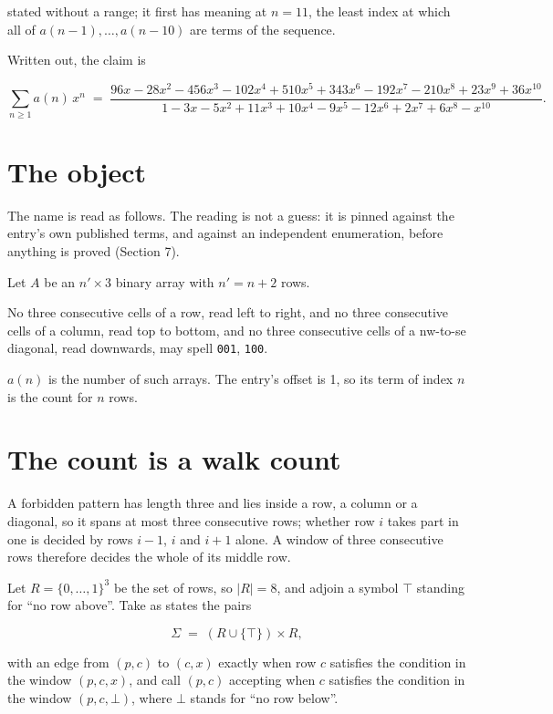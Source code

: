 \documentclass[11pt]{article}
\theoremstyle{definition}
\begin{document}
stated without a range; it first has meaning at $n = 11$, the least index at which all of $a(n-1),\dots,a(n-10)$ are terms of the sequence.

Written out, the claim is

\[\sum_{n \ge 1} a(n)\,x^n \;=\; \frac{96x - 28x^{2} - 456x^{3} - 102x^{4} + 510x^{5} + 343x^{6} - 192x^{7} - 210x^{8} + 23x^{9} + 36x^{10}}{1 - 3x - 5x^{2} + 11x^{3} + 10x^{4} - 9x^{5} - 12x^{6} + 2x^{7} + 6x^{8} - x^{10}}.\]

\section{The object}

The name is read as follows. The reading is not a guess: it is pinned against the entry's own published terms, and against an independent enumeration, before anything is proved (Section 7).

Let $A$ be an $n' \times 3$ binary array with $n' = n + 2$ rows.

No three consecutive cells of a row, read left to right, and no three consecutive cells of a column, read top to bottom, and no three consecutive cells of a nw-to-se diagonal, read downwards, may spell \texttt{001}, \texttt{100}.

$a(n)$ is the number of such arrays. The entry's offset is 1, so its term of index $n$ is the count for $n$ rows.

\section{The count is a walk count}

A forbidden pattern has length three and lies inside a row, a column or a diagonal, so it spans at most three consecutive rows; whether row $i$ takes part in one is decided by rows $i-1$, $i$ and $i+1$ alone. A window of three consecutive rows therefore decides the whole of its middle row.

Let $R = \{0,\dots,1\}^{3}$ be the set of rows, so $|R| = 8$, and adjoin a symbol $\top$ standing for ``no row above''. Take as states the pairs

\[\Sigma \;=\; (R \cup \{\top\}) \times R,\]

with an edge from $(p,c)$ to $(c,x)$ exactly when row $c$ satisfies the condition in the window $(p,c,x)$, and call $(p,c)$ accepting when $c$ satisfies the condition in the window $(p,c,\bot)$, where $\bot$ stands for ``no row below''.
\end{document}
